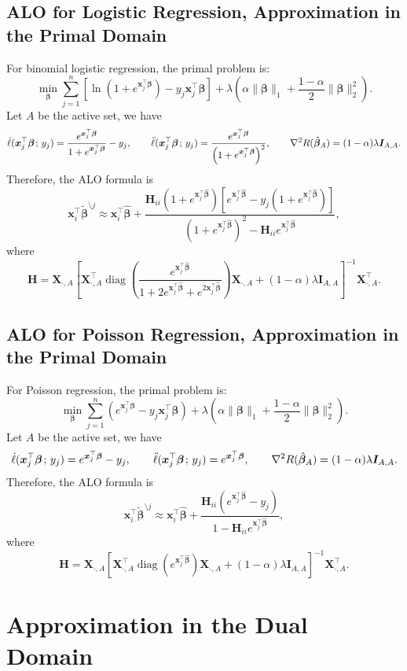 \documentclass[11pt]{article}
\newcommand{\bx}{\bm{x}}
\newcommand{\bH}{\bm{H}}
\newcommand{\bI}{\bm{I}}
\newcommand{\bX}{\bm{X}}
\newcommand{\bbeta}{\bm{\beta}}
\newcommand{\semicol}{\nobreak\mskip2mu\mathpunct{}\nonscript\mkern-\thinmuskip{;}\mskip6muplus1mu\relax}
\DeclareMathOperator{\diag}{diag}
\begin{document}
\subsection{ALO for Logistic Regression, Approximation in the Primal Domain}
For binomial logistic regression, the primal problem is: \[\min_{\bbeta}\sum_{j=1}^{n}\left[\ln\left(1+e^{\bx_j^\top\bbeta}\right)-y_j\bx_j^\top\bbeta\right]+\lambda\left(\alpha\|\bbeta\|_1+\frac{1-\alpha}{2}\|\bbeta\|_2^2\right).\] Let \(A\) be the active set, we have \[\dot{\ell}(\bx_j^\top\bbeta\semicol y_j)=\frac{e^{\bx_j^\top\bbeta}}{1+e^{\bx_j^\top\bbeta}}-y_j,\qquad\ddot{\ell}(\bx_j^\top\bbeta\semicol y_j)=\frac{e^{\bx_j^\top\bbeta}}{\left(1+e^{\bx_j^\top\bbeta}\right)^2},\qquad\nabla^2 R(\hat{\bbeta}_A)=(1-\alpha)\lambda\bI_{A,A}.\] Therefore, the ALO formula is \[\bx_i^\top\tilde{\bbeta}^{\setminus j}\approx\bx_i^\top\hat{\bbeta}+\frac{\bH_{ii}\left(1+e^{\bx_j^\top\hat{\bbeta}}\right)\left[e^{\bx_j^\top\hat{\bbeta}}-y_j\left(1+e^{\bx_j^\top\hat{\bbeta}}\right)\right]}{\left(1+e^{\bx_j^\top\hat{\bbeta}}\right)^2-\bH_{ii}e^{\bx_j^\top\hat{\bbeta}}},\] where \[\bH=\bX_{\cdot,A}\left[\bX_{\cdot,A}^\top\diag\left(\frac{e^{\bx_j^\top\hat{\bbeta}}}{1+2e^{\bx_j^\top\hat{\bbeta}}+e^{2\bx_j^\top\hat{\bbeta}}}\right)\bX_{\cdot,A}+(1-\alpha)\lambda\bI_{A,A}\right]^{-1}\bX_{\cdot,A}^\top.\]

\subsection{ALO for Poisson Regression, Approximation in the Primal Domain}
For Poisson regression, the primal problem is: \[\min_{\bbeta}\sum_{j=1}^{n}\left(e^{\bx_j^\top\bbeta}-y_j\bx_j^\top\bbeta\right)+\lambda\left(\alpha\|\bbeta\|_1+\frac{1-\alpha}{2}\|\bbeta\|_2^2\right).\] Let \(A\) be the active set, we have \[\dot{\ell}(\bx_j^\top\bbeta\semicol y_j)=e^{\bx_j^\top\bbeta}-y_j,\qquad\ddot{\ell}(\bx_j^\top\bbeta\semicol y_j)=e^{\bx_j^\top\bbeta},\qquad\nabla^2 R(\hat{\bbeta}_A)=(1-\alpha)\lambda\bI_{A,A}.\] Therefore, the ALO formula is \[\bx_i^\top\tilde{\bbeta}^{\setminus j}\approx\bx_i^\top\hat{\bbeta}+\frac{\bH_{ii}\left(e^{\bx_j^\top\hat{\bbeta}}-y_j\right)}{1-\bH_{ii}e^{\bx_j^\top\hat{\bbeta}}},\] where \[\bH=\bX_{\cdot,A}\left[\bX_{\cdot,A}^\top\diag\left(e^{\bx_j^\top\hat{\bbeta}}\right)\bX_{\cdot,A}+(1-\alpha)\lambda\bI_{A,A}\right]^{-1}\bX_{\cdot,A}^\top.\]

\section{Approximation in the Dual Domain}
\end{document}
